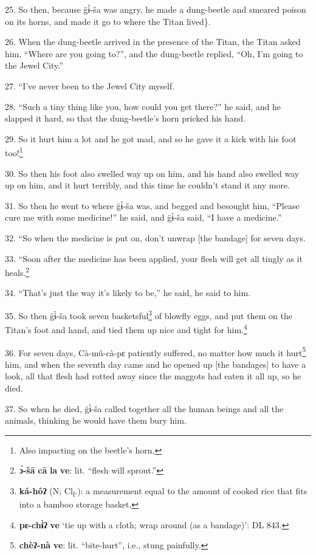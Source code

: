 25. So then, because g̈ɨ̀-ša was angry, he made a dung-beetle and smeared poison
on its horns, and made it go to where the Titan lived\}.

26. When the dung-beetle arrived in the presence of the Titan, the Titan asked
him, ``Where are you going to?'', and the dung-beetle replied, ``Oh, I'm going
to the Jewel City.''

27. ``I've never been to the Jewel City myself.

28. ``Such a tiny thing like you, how could you get there?'' he said, and
he slapped it hard, so that the dung-beetle's horn pricked his hand.

29. So it hurt him a lot and he got mad, and so he gave it a kick with his foot
too!\footnote{Also impacting on the beetle's horn.}

30. So then his foot also swelled way up on him, and his hand also swelled way
up on him, and it hurt terribly, and this time he couldn't stand it any more.

31. So then he went to where g̈ɨ̀-ša was, and begged and besought him, ``Please
cure me with some medicine!'' he said, and g̈ɨ̀-ša said, ``I have a medicine.''

32. ``So when the medicine is put on, don't unwrap [the bandage] for seven
days.

33. ``Soon after the medicine has been applied, your flesh will get all
tingly as it heals.\footnote{\textbf{ɔ̀-šā} \textbf{cā} \textbf{la} \textbf{ve}: lit. ``flesh will sprout.''}

34. ``That's just the way it's likely to be,'' he said, he said to him.

35. So then g̈ɨ̀-ša took seven basketsful\footnote{\textbf{ká-hôʔ} (N; Cl\textsubscript{f}.): a measurement equal to the amount of cooked rice that fits into a bamboo storage basket.} of blowfly eggs, and put them
on the Titan's foot and hand, and tied them up nice and tight for him.\footnote{\textbf{pɛ-chɨ̀ʔ} \textbf{ve} `tie up with a cloth; wrap around (as a bandage)': DL 843.}

36. For seven days, Cà-mû-cà-pɛ patiently suffered, no matter how much it
hurt\footnote{\textbf{chèʔ-nà} \textbf{ve}: lit. ``bite-hurt'', i.e., stung painfully.} him, and when the seventh day came and he opened up [the bandages] to
have a look, all that flesh had rotted away since the maggots had eaten it all
up, so he died.

37. So when he died, g̈ɨ̀-ša called together all the human beings and all the
animals, thinking he would have them bury him.

